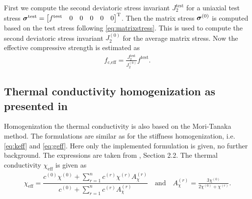 First we compute the second deviatoric stress invariant $J_2^{\text{test}}$ for a uniaxial test stress $\boldsymbol{\sigma}^{\text{test}} = \begin{bmatrix} f^{\text{test}} & 0 & 0 &0&0&0 \end{bmatrix}^\text{T}$. Then the matrix stress $\boldsymbol{\sigma}^{(0)}$ is computed based on the test stress following \eqref{eq:matrixstress}. This is used to compute the second deviatoric stress invariant $J_2^{(0)}$ for the average matrix stress.
Now the effective compressive strength is estimated as
\begin{align}
	f_{\text{c,eff}} = \frac{J_2^{\text{test}}}{J_2^{(0)}}  f^{\text{test}}.
\end{align}


\subsection{Thermal conductivity homogenization as presented in \cite{str_2011_mbeo}}
Homogenization the thermal conductivity is also based on the Mori-Tanaka method.
The formulations are similar as for the stiffness homogenization, i.e. \eqref{eq:keff} and \eqref{eq:geff}.
Here only the implemented formulation is given, no further background.
The expressions are taken from \cite{str_2011_mbeo}, Section 2.2.
The thermal conductivity $\chi_{\text{eff}}$ is given as
\begin{align}
	\chi_{\text{eff}} = \dfrac{c^{(0)}\chi^{(0)} + \sum^{n}_{r=1} c^{(r)} \chi^{(r)} A_{\chi}^{(r)}}{c^{(0)} + \sum^{n}_{r=1} c^{(r)} A_{\chi}^{(r)}}\quad\text{and}\quad
	A_{\chi}^{(r)} = \frac{3\chi^{(0)}}{2\chi^{(0)}+\chi^{(r)}}.
\end{align}

